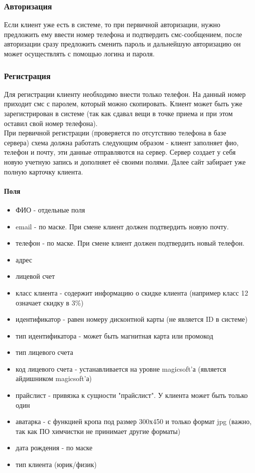 \documentclass[DIV=calc, paper=a4, fontsize=11pt]{scrartcl} %
\begin{document}
\subsubsection{Авторизация}
Если клиент уже есть в системе, то при первичной авторизации, нужно предложить ему ввести номер телефона и подтвердить смс-сообщением, после авторизации сразу предложить сменить пароль и дальнейшую авторизацию он может осуществлять с помощью логина и пароля.

\subsubsection{Регистрация}
Для регистрации клиенту необходимо внести только телефон. На данный номер приходит смс с паролем, который можно скопировать. Клиент может быть уже зарегистрирован в системе (так как сдавал вещи в точке приема и при этом оставил свой номер телефона).
\\[0.5cm]
При первичной регистрации (проверяется по отсутствию телефона в базе сервера) схема должна работать следующим образом - клиент заполняет фио, телефон и почту, эти данные отправляются на сервер. Сервер создает у себя новую учетную запись и дополняет её своими полями. Далее сайт забирает уже полную карточку клиента.

\paragraph{Поля} \label{par:user_fields}
\begin{itemize}
	\item ФИО - отдельные поля
	\item email - по маске. При смене клиент должен подтвердить новую почту.
	\item телефон - по маске. При смене клиент должен подтвердить новый телефон.
	\item адрес
	\item лицевой счет
	\item класс клиента - содержит информацию о скидке клиента (например класс 12 означает скидку в 3\%)
	\item идентификатор - равен номеру дисконтной карты (не является ID в системе)
	\item тип идентификатора - может быть магнитная карта или промокод
	\item тип лицевого счета
	\item код лицевого счета - устанавливается на уровне magicsoft'а (является айдишником magicsoft'а)
	\item прайслист - привязка к сущности "прайслист". У клиента может быть только один
	\item аватарка - с функцией кропа под размер 300х450 и только формат jpg (важно, так как ПО химчистки не принимает другие форматы)
	\item дата рождения - по маске
	\item тип клиента (юрик/физик)
\end{itemize}
\end{document}
